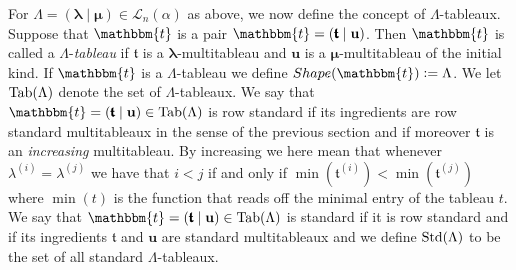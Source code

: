 \documentclass[10pt,a4,twoside,hidelinks,rm]{article}
\newcommand\et{\mathbbm{t}}
\newcommand\bu{\mathbf{u}}
\newcommand{\T}{\mathfrak{t}}
\newcommand{\bT}{\pmb{\mathfrak{t}}}
\newcommand{\Tab}{{\rm Tab}}
\newcommand\blambda{{\boldsymbol\lambda}}
\newcommand\bmu{{\boldsymbol\mu}}
\theoremstyle{plain}
\begin{document}
\medskip



For $ \Lambda=(\blambda \mid  \bmu) \in { \mathcal L}_n(\alpha) $ as above,
we now define the concept of $ \Lambda $-tableaux.
Suppose that $ \et $ is a pair $\et=(\bT \mid \bu) $.
Then $ \et $ is called a $ \Lambda $-\textit{tableau} if $ \bT $ is a
$\blambda$-multitableau and 
$ \bu $ is a {$\bmu$-multitableau of the initial kind.}
If $ \et $ is a $ \Lambda $-tableau we define $ Shape(\et) := \Lambda$.
We let $ \Tab(\Lambda) $ denote the set of $ \Lambda$-tableaux.
We 
say that $ \et = (\bT \mid \bu) \in \Tab(\Lambda) $ is row standard
if its ingredients are row standard multitableaux in the 
sense of the previous section
and if moreover $\bT$ is an \textit{increasing}
multitableau.
By increasing we here mean
that whenever $ \lambda^{(i)} = \lambda^{(j)} $ we have that $ i < j $ if and only if
$ \min ( \T^{
  (i)}) < \min (\T^{(j)}) $ where $ \min (t) $ is the function that reads off the minimal entry of the tableau $ t $.
We say that $ \et = (\bT \mid \bu) \in \Tab(\Lambda) $ is standard if it is row standard 
and if its ingredients $ \bT $ and $ \bu$ are standard multitableaux and
we define $ {\rm Std}(\Lambda) $ to be the set of all standard $\Lambda$-tableaux.
\end{document}

